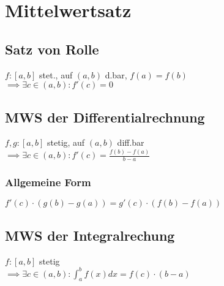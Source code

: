 \section*{Mittelwertsatz}

\subsection*{Satz von Rolle}
$f: [a,b]$ stet., auf $(a,b)$ d.bar, $f(a)=f(b)$ \\
$\implies \exists c\in(a,b): f'(c)=0$

\subsection*{MWS der Differentialrechnung}
$f,g:[a,b]$ stetig, auf $(a,b)$ diff.bar \\
$\implies \exists c\in(a,b): f'(c)=\frac{f(b)-f(a)}{b-a}$

\subsubsection*{Allgemeine Form}
$f'(c)\cdot(g(b)-g(a))=g'(c)\cdot(f(b)-f(a))$

\subsection*{MWS der Integralrechung}
$f: [a,b]$ stetig \\
$\implies \exists c\in(a,b): \int_a^b f(x)dx = f(c)\cdot(b-a)$
